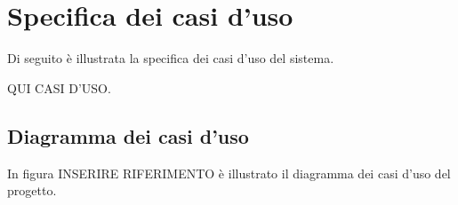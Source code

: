 \section{Specifica dei casi d'uso}

Di seguito \`e illustrata la specifica dei casi d'uso del sistema.

QUI CASI D'USO.

\subsection{Diagramma dei casi d'uso}

In figura INSERIRE RIFERIMENTO \`e illustrato il diagramma dei casi d'uso del progetto.


